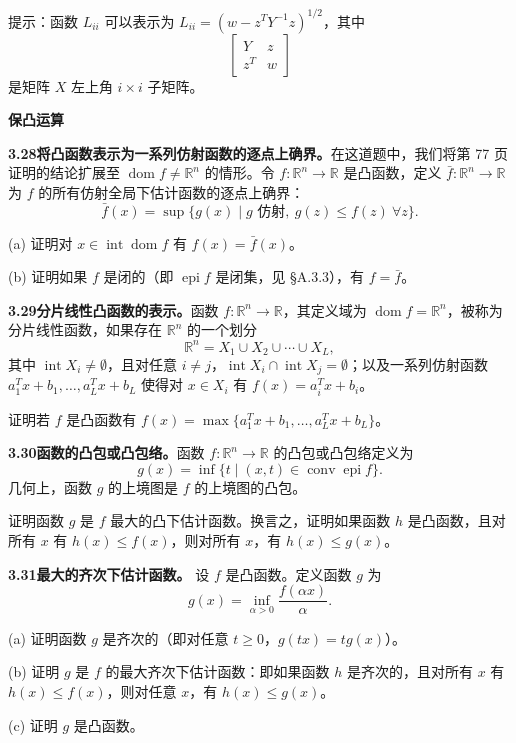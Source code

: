 \documentclass[UTF8, 12pt, fontset=fandol, oneside]{ctexart}
\DeclareMathOperator{\dom}{dom}
\begin{document}
提示：函数 $L_{ii}$ 可以表示为 $L_{ii}=(w-z^TY^{-1}z)^{1/2}$，其中
\[
\begin{bmatrix}
Y & z\\
z^T & w
\end{bmatrix}
\]
是矩阵 $X$ 左上角 $i\times i$ 子矩阵。

\noindent\textbf{保凸运算}

\noindent\textbf{3.28\quad 将凸函数表示为一系列仿射函数的逐点上确界。}\quad 在这道题中，我们将第 77 页证明的结论扩展至 $\dom f\neq\mathbb{R}^n$ 的情形。令 $f:\mathbb{R}^n\to\mathbb{R}$ 是凸函数，定义 $\bar f:\mathbb{R}^n\to\mathbb{R}$ 为 $f$ 的所有仿射全局下估计函数的逐点上确界：
\[
\bar f(x)=\sup\{g(x)\mid g\text{ 仿射},\ g(z)\leq f(z)\ \forall z\}.
\]

(a) 证明对 $x\in\operatorname{int}\dom f$ 有 $f(x)=\bar f(x)$。

(b) 证明如果 $f$ 是闭的（即 $\operatorname{epi} f$ 是闭集，见 \S A.3.3），有 $f=\bar f$。

\noindent\textbf{3.29\quad 分片线性凸函数的表示。}\quad 函数 $f:\mathbb{R}^n\to\mathbb{R}$，其定义域为 $\dom f=\mathbb{R}^n$，被称为分片线性函数，如果存在 $\mathbb{R}^n$ 的一个划分
\[
\mathbb{R}^n=X_1\cup X_2\cup\cdots\cup X_L,
\]
其中 $\operatorname{int}X_i\neq\emptyset$，且对任意 $i\neq j$，$\operatorname{int}X_i\cap\operatorname{int}X_j=\emptyset$；以及一系列仿射函数 $a_1^Tx+b_1,\ldots,a_L^Tx+b_L$ 使得对 $x\in X_i$ 有 $f(x)=a_i^Tx+b_i$。

证明若 $f$ 是凸函数有 $f(x)=\max\{a_1^Tx+b_1,\ldots,a_L^Tx+b_L\}$。

\noindent\textbf{3.30\quad 函数的凸包或凸包络。}\quad 函数 $f:\mathbb{R}^n\to\mathbb{R}$ 的凸包或凸包络定义为
\[
g(x)=\inf\{t\mid (x,t)\in\operatorname{conv}\operatorname{epi} f\}.
\]
几何上，函数 $g$ 的上境图是 $f$ 的上境图的凸包。

证明函数 $g$ 是 $f$ 最大的凸下估计函数。换言之，证明如果函数 $h$ 是凸函数，且对所有 $x$ 有 $h(x)\leq f(x)$，则对所有 $x$，有 $h(x)\leq g(x)$。

\noindent\textbf{3.31}\quad [Roc70，第 35 页] \textbf{最大的齐次下估计函数。} 设 $f$ 是凸函数。定义函数 $g$ 为
\[
g(x)=\inf_{\alpha>0}\frac{f(\alpha x)}{\alpha}.
\]

(a) 证明函数 $g$ 是齐次的（即对任意 $t\geq0$，$g(tx)=tg(x)$）。

(b) 证明 $g$ 是 $f$ 的最大齐次下估计函数：即如果函数 $h$ 是齐次的，且对所有 $x$ 有 $h(x)\leq f(x)$，则对任意 $x$，有 $h(x)\leq g(x)$。

(c) 证明 $g$ 是凸函数。
\end{document}
